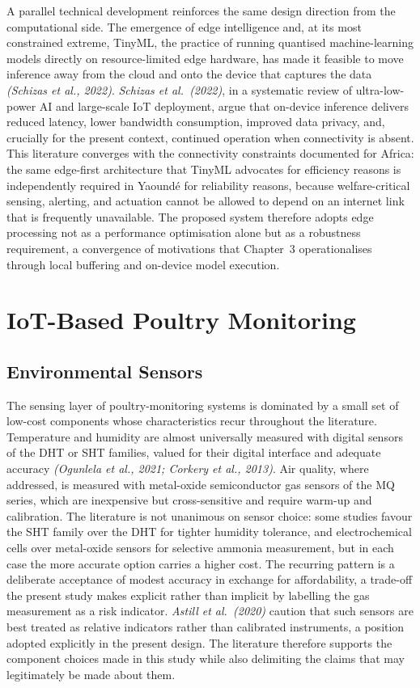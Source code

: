 \documentclass[12pt,a4paper]{report}
\begin{document}
A parallel technical development reinforces the same design direction from the computational side. The emergence of edge intelligence and, at its most constrained extreme, TinyML, the practice of running quantised machine-learning models directly on resource-limited edge hardware, has made it feasible to move inference away from the cloud and onto the device that captures the data \textit{(Schizas et al., 2022)}. \textit{Schizas et al.\ (2022)}, in a systematic review of ultra-low-power AI and large-scale IoT deployment, argue that on-device inference delivers reduced latency, lower bandwidth consumption, improved data privacy, and, crucially for the present context, continued operation when connectivity is absent. This literature converges with the connectivity constraints documented for Africa: the same edge-first architecture that TinyML advocates for efficiency reasons is independently required in Yaound\'e for reliability reasons, because welfare-critical sensing, alerting, and actuation cannot be allowed to depend on an internet link that is frequently unavailable. The proposed system therefore adopts edge processing not as a performance optimisation alone but as a robustness requirement, a convergence of motivations that Chapter~3 operationalises through local buffering and on-device model execution.

\section{IoT-Based Poultry Monitoring}

\subsection{Environmental Sensors}

The sensing layer of poultry-monitoring systems is dominated by a small set of low-cost components whose characteristics recur throughout the literature. Temperature and humidity are almost universally measured with digital sensors of the DHT or SHT families, valued for their digital interface and adequate accuracy \textit{(Ogunlela et al., 2021; Corkery et al., 2013)}. Air quality, where addressed, is measured with metal-oxide semiconductor gas sensors of the MQ series, which are inexpensive but cross-sensitive and require warm-up and calibration. The literature is not unanimous on sensor choice: some studies favour the SHT family over the DHT for tighter humidity tolerance, and electrochemical cells over metal-oxide sensors for selective ammonia measurement, but in each case the more accurate option carries a higher cost. The recurring pattern is a deliberate acceptance of modest accuracy in exchange for affordability, a trade-off the present study makes explicit rather than implicit by labelling the gas measurement as a risk indicator. \textit{Astill et al.\ (2020)} caution that such sensors are best treated as relative indicators rather than calibrated instruments, a position adopted explicitly in the present design. The literature therefore supports the component choices made in this study while also delimiting the claims that may legitimately be made about them.
\end{document}
